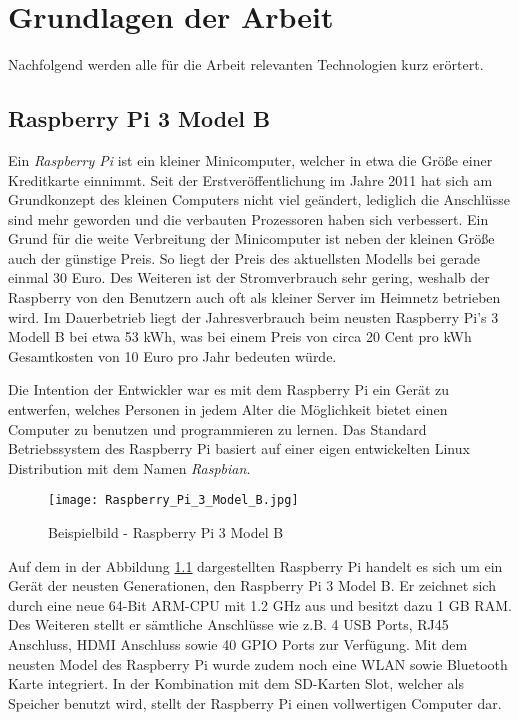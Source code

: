 
\chapter{Grundlagen der Arbeit}

Nachfolgend werden alle für die Arbeit relevanten Technologien kurz erörtert.

\section{Raspberry Pi 3 Model B}
Ein \textit{Raspberry Pi} ist ein kleiner Minicomputer, welcher in etwa die
Größe einer Kreditkarte einnimmt. Seit der Erstveröffentlichung im Jahre 2011
hat sich am Grundkonzept des kleinen Computers nicht viel geändert, lediglich
die Anschlüsse sind mehr geworden und die verbauten Prozessoren haben sich
verbessert. \autocite{monk_2019} \newline
Ein Grund für die weite Verbreitung der Minicomputer ist neben der kleinen
Größe auch der günstige Preis. So liegt der Preis des aktuellsten Modells bei
gerade einmal 30 Euro. Des Weiteren ist der Stromverbrauch sehr gering, weshalb
der Raspberry von den Benutzern auch oft als kleiner Server im Heimnetz
betrieben wird. Im Dauerbetrieb liegt der Jahresverbrauch beim neusten
Raspberry Pi's 3 Modell B bei etwa 53 kWh, was bei einem Preis von circa 20
Cent pro kWh Gesamtkosten von 10 Euro pro Jahr bedeuten würde. \newline

Die Intention der Entwickler war es mit dem Raspberry Pi ein Gerät zu
entwerfen, welches Personen in jedem Alter die Möglichkeit bietet einen
Computer zu benutzen und programmieren zu lernen. Das Standard Betriebssystem
des Raspberry Pi basiert auf einer eigen entwickelten Linux Distribution mit
dem Namen \textit{Raspbian}.
\autocite{what_is_a_raspberry_pi?_2019}
\begin{figure}[h]
	\centering
	\texttt{[image: Raspberry\_Pi\_3\_Model\_B.jpg]}
	\caption{Beispielbild - Raspberry Pi 3 Model B \autocite{raspberry_pi_2019}}
	\label{img:grafik-RaspberryPi3}
\end{figure}
\newline

Auf dem in der Abbildung \ref{img:grafik-RaspberryPi3} dargestellten Raspberry
Pi handelt es sich um ein Gerät der neusten Generationen, den Raspberry Pi 3
Model B. Er zeichnet sich durch eine neue 64-Bit \ac{ARM}-\ac{CPU} mit 1.2
\ac{GHz} aus und besitzt dazu 1 \ac{GB} \ac{RAM}. Des Weiteren stellt er
sämtliche Anschlüsse wie z.B. 4 \ac{USB} Ports, RJ45 Anschluss, \ac{HDMI}
Anschluss sowie 40 \ac{GPIO} Ports zur Verfügung. Mit dem neusten Model des
Raspberry Pi wurde zudem noch eine \ac{WLAN} sowie Bluetooth Karte integriert.
In der Kombination mit dem \ac{SD-Karten} Slot, welcher als Speicher benutzt
wird, stellt der Raspberry Pi einen vollwertigen Computer dar.
\autocite{kurniawan_2016}
 
